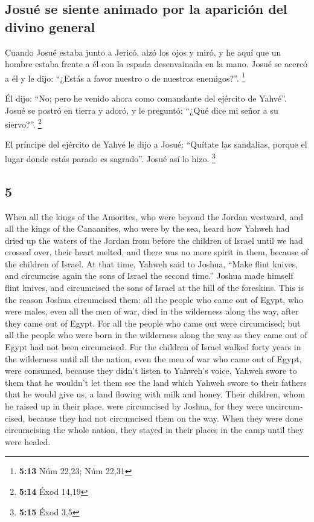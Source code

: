 \begin{paracol}{2}
\hypertarget{josuuxe9-se-siente-animado-por-la-apariciuxf3n-del-divino-general}{%
\subsection{Josué se siente animado por la aparición del divino
general}\label{josuuxe9-se-siente-animado-por-la-apariciuxf3n-del-divino-general}}

 Cuando Josué estaba junto a Jericó, alzó los ojos y
miró, y he aquí que un hombre estaba frente a él con la espada
desenvainada en la mano. Josué se acercó a él y le dijo: ``¿Estás a
favor nuestro o de nuestros enemigos?''. \footnote{\textbf{5:13} Núm
  22,23; Núm 22,31}

 Él dijo: ``No; pero he venido ahora como comandante del
ejército de Yahvé''. Josué se postró en tierra y adoró, y le preguntó:
``¿Qué dice mi señor a su siervo?''. \footnote{\textbf{5:14} Éxod 14,19}

 El príncipe del ejército de Yahvé le dijo a Josué:
``Quítate las sandalias, porque el lugar donde estás parado es
sagrado''. Josué así lo hizo. \footnote{\textbf{5:15} Éxod 3,5}

\switchcolumn
\begin{otherlanguage}{english}

\hypertarget{section-9}{%
\section{5}\label{section-9}}

 When all the kings of the Amorites, who were beyond the
Jordan westward, and all the kings of the Canaanites, who were by the
sea, heard how Yahweh had dried up the waters of the Jordan from before
the children of Israel until we had crossed over, their heart melted,
and there was no more spirit in them, because of the children of Israel.
 At that time, Yahweh said to Joshua, ``Make flint knives,
and circumcise again the sons of Israel the second time.''
 Joshua made himself flint knives, and circumcised the
sons of Israel at the hill of the foreskins.  This is the
reason Joshua circumcised them: all the people who came out of Egypt,
who were males, even all the men of war, died in the wilderness along
the way, after they came out of Egypt.  For all the people
who came out were circumcised; but all the people who were born in the
wilderness along the way as they came out of Egypt had not been
circumcised.  For the children of Israel walked forty
years in the wilderness until all the nation, even the men of war who
came out of Egypt, were consumed, because they didn't listen to Yahweh's
voice. Yahweh swore to them that he wouldn't let them see the land which
Yahweh swore to their fathers that he would give us, a land flowing with
milk and honey.  Their children, whom he raised up in
their place, were circumcised by Joshua, for they were uncircumcised,
because they had not circumcised them on the way.  When
they were done circumcising the whole nation, they stayed in their
places in the camp until they were healed.


\end{otherlanguage}
\end{paracol}
